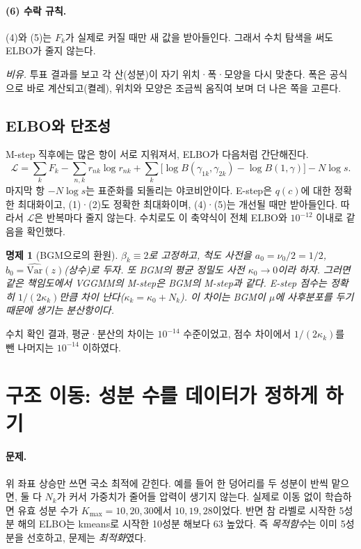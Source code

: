 \documentclass[11pt]{article}
\newtheorem{proposition}{명제}
\begin{document}
\paragraph{(6) 수락 규칙.}
(4)와 (5)는 $F_k$가 실제로 커질 때만 새 값을 받아들인다. 그래서 수치 탐색을 써도 ELBO가 줄지 않는다.

\emph{비유.} 투표 결과를 보고 각 산(성분)이 자기 위치·폭·모양을 다시 맞춘다. 폭은 공식으로 바로 계산되고(켤레), 위치와 모양은 조금씩 움직여 보며 더 나은 쪽을 고른다.

\subsection{ELBO와 단조성}
M-step 직후에는 많은 항이 서로 지워져서, ELBO가 다음처럼 간단해진다.
\begin{equation}
  \mathcal{L}=\sum_kF_k-\sum_{n,k}r_{nk}\log r_{nk}+\sum_k\big[\log B(\gamma_{1k},\gamma_{2k})-\log B(1,\gamma)\big]-N\log s .
\end{equation}
마지막 항 $-N\log s$는 표준화를 되돌리는 야코비안이다.
E-step은 $q(c)$에 대한 정확한 최대화이고, (1)·(2)도 정확한 최대화이며, (4)·(5)는 개선될 때만 받아들인다. 따라서 $\mathcal{L}$은 반복마다 줄지 않는다.
수치로도 이 축약식이 전체 ELBO와 $10^{-12}$ 이내로 같음을 확인했다.

\begin{proposition}[BGM으로의 환원]\label{prop:bgm}
$\beta_k\equiv2$로 고정하고, 척도 사전을 $a_0=\nu_0/2=1/2$, $b_0=\widehat{\mathrm{Var}}(z)$(상수)로 두자. 또 BGM의 평균 정밀도 사전 $\kappa_0\to0$이라 하자.
그러면 같은 책임도에서 VGGMM의 M-step은 BGM의 M-step과 같다.
E-step 점수는 정확히 $1/(2\kappa_k)$만큼 차이 난다($\kappa_k=\kappa_0+N_k$). 이 차이는 BGM이 $\mu$에 사후분포를 두기 때문에 생기는 분산항이다.
\end{proposition}
수치 확인 결과, 평균·분산의 차이는 $10^{-14}$ 수준이었고, 점수 차이에서 $1/(2\kappa_k)$를 뺀 나머지는 $10^{-14}$ 이하였다.

\section{구조 이동: 성분 수를 데이터가 정하게 하기}

\paragraph{문제.}
위 좌표 상승만 쓰면 국소 최적에 갇힌다. 예를 들어 한 덩어리를 두 성분이 반씩 맡으면, 둘 다 $N_k$가 커서 가중치가 줄어들 압력이 생기지 않는다.
실제로 이동 없이 학습하면 유효 성분 수가 $K_{\max}=10,20,30$에서 $10,19,28$이었다.
반면 참 라벨로 시작한 5성분 해의 ELBO는 kmeans로 시작한 10성분 해보다 $63$ 높았다. 즉 \emph{목적함수}는 이미 5성분을 선호하고, 문제는 \emph{최적화}였다.
\end{document}
